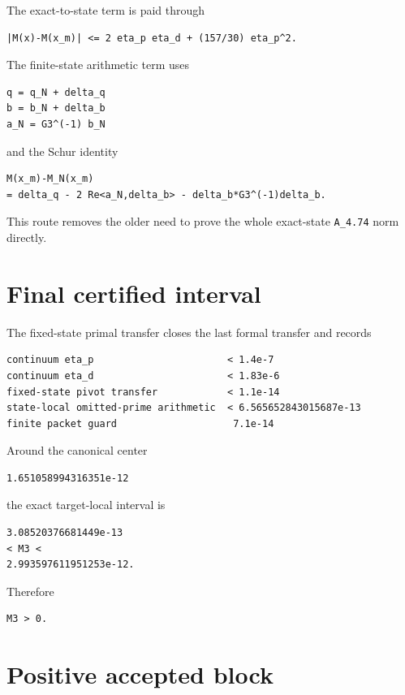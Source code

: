 The exact-to-state term is paid through

\begin{verbatim}
|M(x)-M(x_m)| <= 2 eta_p eta_d + (157/30) eta_p^2.
\end{verbatim}

The finite-state arithmetic term uses

\begin{verbatim}
q = q_N + delta_q
b = b_N + delta_b
a_N = G3^(-1) b_N
\end{verbatim}

and the Schur identity

\begin{verbatim}
M(x_m)-M_N(x_m)
= delta_q - 2 Re<a_N,delta_b> - delta_b*G3^(-1)delta_b.
\end{verbatim}

This route removes the older need to prove the whole exact-state \texttt{A\_4.74} norm directly.

\hypertarget{final-certified-interval}{%
\section{Final certified interval}\label{final-certified-interval}}

The fixed-state primal transfer closes the last formal transfer and records

\begin{verbatim}
continuum eta_p                       < 1.4e-7
continuum eta_d                       < 1.83e-6
fixed-state pivot transfer            < 1.1e-14
state-local omitted-prime arithmetic  < 6.565652843015687e-13
finite packet guard                    7.1e-14
\end{verbatim}

Around the canonical center

\begin{verbatim}
1.651058994316351e-12
\end{verbatim}

the exact target-local interval is

\begin{verbatim}
3.08520376681449e-13
< M3 <
2.993597611951253e-12.
\end{verbatim}

Therefore

\begin{verbatim}
M3 > 0.
\end{verbatim}

\hypertarget{positive-accepted-block}{%
\section{Positive accepted block}\label{positive-accepted-block}}

